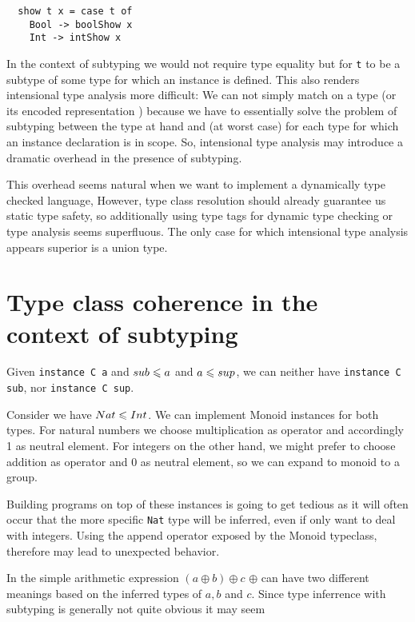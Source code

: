 \begin{verbatim}
  show t x = case t of
    Bool -> boolShow x
    Int -> intShow x
\end{verbatim}

In the context of subtyping we would not require type equality but for \texttt{t} to be a subtype of some type for which an instance is defined.
This also renders intensional type analysis more difficult:
We can not simply match on a type (or its encoded representation \cite{weirich2000}) because we have to essentially solve the problem of subtyping between the type at hand and (at worst case) for each type for which an instance declaration is in scope.
So, intensional type analysis may introduce a dramatic overhead in the presence of subtyping.

This overhead seems natural when we want to implement a dynamically type checked language,
However, type class resolution should already guarantee us static type safety, so additionally using type tags for dynamic type checking or type analysis seems superfluous.
The only case for which intensional type analysis appears superior is a union type.

\section{Type class coherence in the context of subtyping}
  Given \texttt{instance C a} and $sub \leqslant a$ and $a \leqslant sup$, we can neither have \texttt{instance C sub}, nor \texttt{instance C sup}.

  Consider we have $Nat \leqslant Int$.
  We can implement Monoid instances for both types. For natural numbers we choose multiplication as operator and accordingly 1 as neutral element.
  For integers on the other hand, we might prefer to choose addition as operator and 0 as neutral element, so we can expand to monoid to a group.

  Building programs on top of these instances is going to get tedious as it will often occur that the more specific \texttt{Nat} type will be inferred,
  even if only want to deal with integers.
  Using the append operator exposed by the Monoid typeclass, therefore may lead to unexpected behavior.

  In the simple arithmetic expression $(a \oplus b) \oplus c$ $\oplus$ can have two different meanings based on the inferred types of $a,b$ and $c$.
  Since type inferrence with subtyping is generally not quite obvious it may seem 

